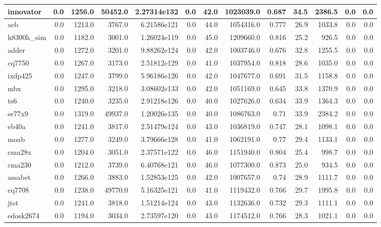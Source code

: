 \begin{tabular}{|l r r r r| r r r r r r | r r|}
\hline
innovator & 0.0 & 1256.0 & 50452.0 & 2.27314e132 & 0.0 & 42.0 & 1023039.0 & 0.687 & 34.5 & 2386.5 & 0.0 & 0.0 \\
\hline
aeb & 0.0 & 1213.0 & 3767.0 & 6.21586e121 & 0.0 & 44.0 & 1054316.0 & 0.777 & 26.9 & 1033.8 & 0.0 & 0.0 \\
\hline
h8300h\_sim & 0.0 & 1182.0 & 3001.0 & 1.26024e119 & 0.0 & 45.0 & 1209660.0 & 0.816 & 25.2 & 926.5 & 0.0 & 0.0 \\
\hline
adder & 0.0 & 1272.0 & 3201.0 & 9.88262e124 & 0.0 & 42.0 & 1003746.0 & 0.676 & 32.8 & 1255.5 & 0.0 & 0.0 \\
\hline
cq7750 & 0.0 & 1267.0 & 3173.0 & 2.51812e129 & 0.0 & 41.0 & 1037954.0 & 0.818 & 28.6 & 1035.0 & 0.0 & 0.0 \\
\hline
ixdp425 & 0.0 & 1247.0 & 3799.0 & 5.96186e126 & 0.0 & 42.0 & 1047677.0 & 0.691 & 31.5 & 1158.8 & 0.0 & 0.0 \\
\hline
mbx & 0.0 & 1295.0 & 3218.0 & 3.08602e133 & 0.0 & 42.0 & 1051169.0 & 0.645 & 33.8 & 1370.9 & 0.0 & 0.0 \\
\hline
ts6 & 0.0 & 1240.0 & 3235.0 & 2.91218e126 & 0.0 & 40.0 & 1027626.0 & 0.634 & 33.9 & 1364.3 & 0.0 & 0.0 \\
\hline
se77x9 & 0.0 & 1319.0 & 49937.0 & 1.20026e135 & 0.0 & 40.0 & 1086763.0 & 0.71 & 33.9 & 2384.2 & 0.0 & 0.0 \\
\hline
eb40a & 0.0 & 1241.0 & 3817.0 & 2.51479e124 & 0.0 & 43.0 & 1036819.0 & 0.747 & 28.1 & 1098.1 & 0.0 & 0.0 \\
\hline
moab & 0.0 & 1277.0 & 3249.0 & 3.79666e128 & 0.0 & 41.0 & 1062191.0 & 0.77 & 29.4 & 1133.1 & 0.0 & 0.0 \\
\hline
cma28x & 0.0 & 1204.0 & 3051.0 & 2.37571e122 & 0.0 & 46.0 & 1151940.0 & 0.804 & 25.4 & 998.7 & 0.0 & 0.0 \\
\hline
cma230 & 0.0 & 1212.0 & 3739.0 & 6.40768e121 & 0.0 & 46.0 & 1077300.0 & 0.873 & 25.0 & 934.5 & 0.0 & 0.0 \\
\hline
assabet & 0.0 & 1266.0 & 3883.0 & 1.52853e125 & 0.0 & 42.0 & 1007657.0 & 0.74 & 28.9 & 1111.7 & 0.0 & 0.0 \\
\hline
cq7708 & 0.0 & 1238.0 & 49770.0 & 5.16325e121 & 0.0 & 41.0 & 1119432.0 & 0.766 & 29.7 & 1995.8 & 0.0 & 0.0 \\
\hline
jtst & 0.0 & 1241.0 & 3818.0 & 1.51214e124 & 0.0 & 43.0 & 1132636.0 & 0.732 & 29.3 & 1111.1 & 0.0 & 0.0 \\
\hline
edosk2674 & 0.0 & 1194.0 & 3034.0 & 2.73597e120 & 0.0 & 43.0 & 1174512.0 & 0.766 & 28.3 & 1021.1 & 0.0 & 0.0 \\

\end{tabular}
